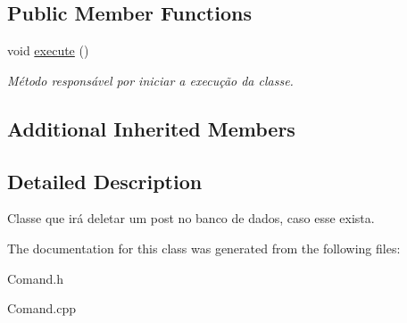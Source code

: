 \subsection*{Public Member Functions}
\begin{DoxyCompactItemize}
\item 
\hypertarget{class_command_delete_post_af93e629833de0fa3415294802258d243}{void \hyperlink{class_command_delete_post_af93e629833de0fa3415294802258d243}{execute} ()}\label{class_command_delete_post_af93e629833de0fa3415294802258d243}

\begin{DoxyCompactList}\small\item\em Método responsável por iniciar a execução da classe. \end{DoxyCompactList}\end{DoxyCompactItemize}
\subsection*{Additional Inherited Members}


\subsection{Detailed Description}
Classe que irá deletar um post no banco de dados, caso esse exista. 

The documentation for this class was generated from the following files\-:\begin{DoxyCompactItemize}
\item 
Comand.\-h\item 
Comand.\-cpp\end{DoxyCompactItemize}

